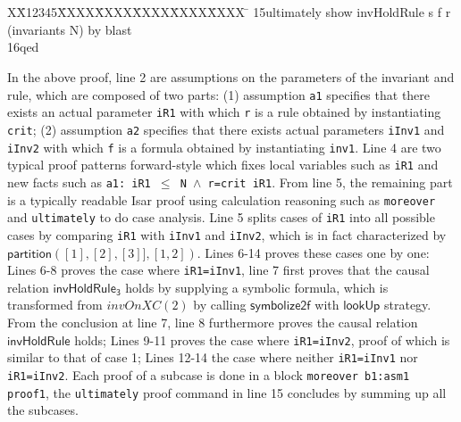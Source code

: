 \documentclass[conference]{IEEEtran}
\newlength{\fminilength}
\newenvironment{fmini}[1][\linewidth]
  {\setlength{\fminilength}{#1\fboxsep-2\fboxrule}%
   \vspace{2ex}\noindent\begin{lrbox}{\fminibox}\begin{minipage}{\fminilength}%
   \mbox{ }\hfill\vspace{-2.5ex}}%
  {\end{minipage}\end{lrbox}\vspace{1ex}\hspace{0ex}%
   \framebox{\usebox{\fminibox}}}
\newenvironment{specification}
{\noindent\scriptsize
\tt\begin{fmini}\begin{tabbing}X\=X12345\=XXXX\=XXXX\=XXXX\=XXXX\=XXXX
\=\+\kill} {\end{tabbing}\normalfont\end{fmini}}
\def \iInv {iInv}
\def \iR {iR}
\begin{document}
{\begin{specification}
15ultimately show invHoldRule s f r
(invariants N) by blast\\
16qed\\
\end{specification}


In the above proof, line 2 are assumptions on the parameters of the invariant and rule, which are composed of two parts: (1) assumption {\tt a1} specifies that there exists an actual parameter {\tt \iR1} with which {\tt r} is a rule obtained by instantiating {\tt crit}; (2) assumption {\tt a2} specifies that  there exists   actual parameters {\tt \iInv1} and {\tt \iInv2} with which {\tt f} is a formula obtained by instantiating {\tt inv1}.
Line 4 are two typical  proof patterns forward-style which fixes local variables such as {\tt \iR1} and new facts such as {\tt a1: iR1 $\le$ N $\wedge$ r=crit \iR1}. From line 5, the remaining part  is a typically readable Isar proof using calculation
reasoning such as {\tt moreover} and {\tt ultimately} to do  case analysis.
Line 5 splits cases of {\tt iR1} into all possible cases by comparing
{\tt \iR1} with {\tt \iInv1} and {\tt \iInv2}, which is in fact characterized by $\mathsf{partition}([1],[2],[3]],[1,2])$. Lines 6-14  proves    these cases one by one: Lines 6-8 proves the case where {\tt iR1=\iInv1}, line 7 first proves that the causal relation $\mathsf{invHoldRule_3}$ holds by supplying a symbolic formula, which is transformed from $invOnXC(2)$  by calling $\mathsf{symbolize2f}$ with $\mathsf{lookUp}$ strategy.  %
From the conclusion at line 7, line 8 furthermore proves the causal relation $\mathsf{invHoldRule}$  holds; Lines 9-11 proves the case where {\tt iR1=\iInv2}, proof of which is similar to that of case 1; Lines 12-14 the case   where neither {\tt iR1=\iInv1} nor {\tt iR1=\iInv2}. Each proof of a subcase is done in a block {\tt moreover b1:asm1 proof1}, the {\tt ultimately}  proof command in line 15 concludes by summing up all the subcases.



}
\end{document}
